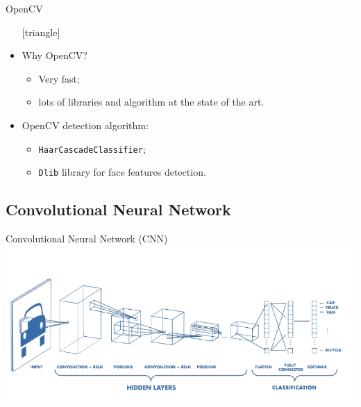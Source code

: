 \documentclass{beamer}
\begin{document}
\begin{frame}{OpenCV}
	\begin{itemize}
		\setlength\itemsep{1em}
		[triangle]
		\item
			Why OpenCV?
			\begin{itemize}
				[circle]
				\item 
					Very fast;
				\item 
					lots of libraries and algorithm at the state of the art.
			\end{itemize}
		\item 
			OpenCV detection algorithm:
			\begin{itemize}
				[circle]
				\item 
					\texttt{HaarCascadeClassifier};
				\item 
					\texttt{Dlib} library for face features detection.
			\end{itemize}
	\end{itemize}
\end{frame}




\subsection{Convolutional Neural Network}

\begin{frame}{Convolutional Neural Network (CNN)}
	\includegraphics[scale=0.45]{CNN}
\end{frame}
\end{document}
